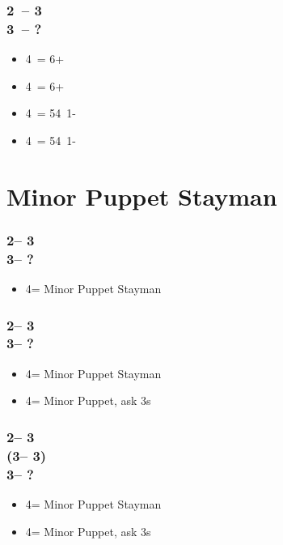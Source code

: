\documentclass[12pt, a4paper]{report}
\begin{document}
{{        \subsubsection*{2\ntx\ -- 3\spades \\ 3\nt\ -- ?}
        \begin{itemize}
            \item 4\clubs\ = 6+\clubs
            \item 4\diams\ = 6+\diams
            \item 4\hearts\ = 54\minor\ 1-\hearts
            \item 4\spades\ = 54\minor\ 1-\spades
        \end{itemize}
    

        \section*{\colorbox{blue!30}{Minor Puppet Stayman}}
         {
            \subsubsection*{2\nt -- 3\clubs\\
                        3\diams -- ?}
            \begin{itemize}
                \item 4\clubs = Minor Puppet Stayman
            \end{itemize}

            \subsubsection*{2\nt -- 3\clubs\\
                            3\major -- ?}
            \begin{itemize}
                \item 4\clubs = Minor Puppet Stayman
                \item 4\diams = Minor Puppet, ask 3s
            \end{itemize}

            \subsubsection*{2\nt -- 3\clubs\\
                            (3\diams -- 3\major)\\
                            3\nt -- ?}
            \begin{itemize}
                \item 4\clubs = Minor Puppet Stayman
                \item 4\diams = Minor Puppet, ask 3s
            \end{itemize}

}}}
\end{document}
